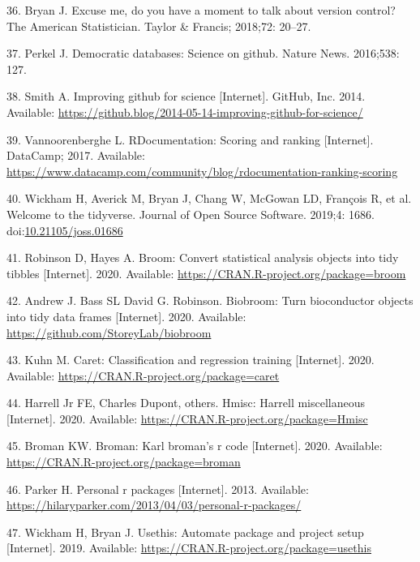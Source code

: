 \documentclass[10pt,letterpaper]{article}
\begin{document}
\leavevmode\hypertarget{ref-bryan2018}{}%
36. Bryan J. Excuse me, do you have a moment to talk about version
control? The American Statistician. Taylor \& Francis; 2018;72: 20--27.

\leavevmode\hypertarget{ref-perkel2016}{}%
37. Perkel J. Democratic databases: Science on github. Nature News.
2016;538: 127.

\leavevmode\hypertarget{ref-smith2014}{}%
38. Smith A. Improving github for science {[}Internet{]}. GitHub, Inc.
2014. Available:
\url{https://github.blog/2014-05-14-improving-github-for-science/}

\leavevmode\hypertarget{ref-vannoorenberghe2017}{}%
39. Vannoorenberghe L. RDocumentation: Scoring and ranking
{[}Internet{]}. DataCamp; 2017. Available:
\url{https://www.datacamp.com/community/blog/rdocumentation-ranking-scoring}

\leavevmode\hypertarget{ref-tidyverse}{}%
40. Wickham H, Averick M, Bryan J, Chang W, McGowan LD, François R, et
al. Welcome to the tidyverse. Journal of Open Source Software. 2019;4:
1686.
doi:\href{https://doi.org/10.21105/joss.01686}{10.21105/joss.01686}

\leavevmode\hypertarget{ref-broom}{}%
41. Robinson D, Hayes A. Broom: Convert statistical analysis objects
into tidy tibbles {[}Internet{]}. 2020. Available:
\url{https://CRAN.R-project.org/package=broom}

\leavevmode\hypertarget{ref-biobroom}{}%
42. Andrew J. Bass SL David G. Robinson. Biobroom: Turn bioconductor
objects into tidy data frames {[}Internet{]}. 2020. Available:
\url{https://github.com/StoreyLab/biobroom}

\leavevmode\hypertarget{ref-caret}{}%
43. Kuhn M. Caret: Classification and regression training
{[}Internet{]}. 2020. Available:
\url{https://CRAN.R-project.org/package=caret}

\leavevmode\hypertarget{ref-Hmisc}{}%
44. Harrell Jr FE, Charles Dupont, others. Hmisc: Harrell miscellaneous
{[}Internet{]}. 2020. Available:
\url{https://CRAN.R-project.org/package=Hmisc}

\leavevmode\hypertarget{ref-broman}{}%
45. Broman KW. Broman: Karl broman's r code {[}Internet{]}. 2020.
Available: \url{https://CRAN.R-project.org/package=broman}

\leavevmode\hypertarget{ref-parker2013}{}%
46. Parker H. Personal r packages {[}Internet{]}. 2013. Available:
\url{https://hilaryparker.com/2013/04/03/personal-r-packages/}

\leavevmode\hypertarget{ref-usethis}{}%
47. Wickham H, Bryan J. Usethis: Automate package and project setup
{[}Internet{]}. 2019. Available:
\url{https://CRAN.R-project.org/package=usethis}
\end{document}
